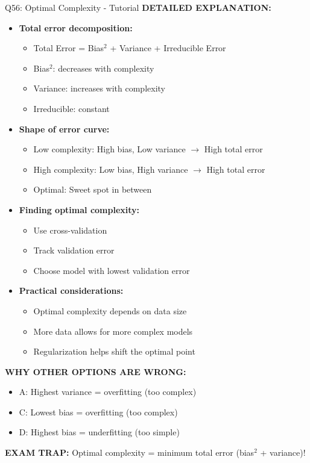 \documentclass[8pt]{beamer}
\begin{document}
\begin{frame}{Q56: Optimal Complexity - Tutorial}
		\vspace{0.05cm}
		\textbf{DETAILED EXPLANATION:}
		\begin{itemize}
			\item \textbf{Total error decomposition:}
			\begin{itemize}
				\item Total Error = Bias$^2$ + Variance + Irreducible Error
				\item Bias$^2$: decreases with complexity
				\item Variance: increases with complexity
				\item Irreducible: constant
			\end{itemize}
			\item \textbf{Shape of error curve:}
			\begin{itemize}
				\item Low complexity: High bias, Low variance $\to$ High total error
				\item High complexity: Low bias, High variance $\to$ High total error
				\item Optimal: Sweet spot in between
			\end{itemize}
			\item \textbf{Finding optimal complexity:}
			\begin{itemize}
				\item Use cross-validation
				\item Track validation error
				\item Choose model with lowest validation error
			\end{itemize}
			\item \textbf{Practical considerations:}
			\begin{itemize}
				\item Optimal complexity depends on data size
				\item More data allows for more complex models
				\item Regularization helps shift the optimal point
			\end{itemize}
		\end{itemize}
		
		\vspace{0.05cm}
		\textcolor{myred}{\textbf{WHY OTHER OPTIONS ARE WRONG:}}
		\begin{itemize}
			\item \textcolor{myred}{A:} Highest variance = overfitting (too complex)
			\item \textcolor{myred}{C:} Lowest bias = overfitting (too complex)
			\item \textcolor{myred}{D:} Highest bias = underfitting (too simple)
		\end{itemize}
		
		\textcolor{myred}{\textbf{EXAM TRAP:}} Optimal complexity = minimum total error (bias$^2$ + variance)!
	\end{frame}
	
\end{document}
